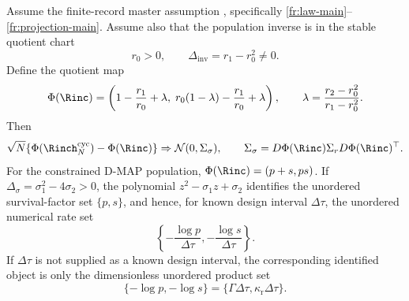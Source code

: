 \begin{proposition}\label{prop:finite-record-quotient-delta-detailed}
Assume the finite-record master assumption
, specifically
\ref{fr:law-main}--\ref{fr:projection-main}.  Assume also that the population
inverse is in the stable quotient chart
\[
r_0>0,\qquad \Delta_{\mathrm{inv}}=r_1-r_0^2\ne0 .
\]
Define the quotient map
\[
\Phi(\Rinc)=\left(1-\frac{r_1}{r_0}+\lambda,\;
r_0(1-\lambda)-\frac{r_1}{r_0}+\lambda\right),
\qquad
\lambda=\frac{r_2-r_0^2}{r_1-r_0^2}.
\]
Then
\[
\sqrt N\{\Phi(\Rinch_N^{\mathrm{cyc}})-\Phi(\Rinc)\}
\Rightarrow
\mathcal N(0,\Sigma_\sigma),
\qquad
\Sigma_\sigma=D\Phi(\Rinc)\Sigma_rD\Phi(\Rinc)^\top.
\]
For the constrained D-MAP population, \(\Phi(\Rinc)=(p+s,ps)\).  If
\(\Delta_\sigma=\sigma_1^2-4\sigma_2>0\), the polynomial
\(z^2-\sigma_1z+\sigma_2\) identifies the unordered survival-factor set
\(\{p,s\}\), and hence, for known design interval \(\Delta\tau\), the
unordered numerical rate set
\[
\left\{-\frac{\log p}{\Delta\tau},-\frac{\log s}{\Delta\tau}\right\}.
\]
If \(\Delta\tau\) is not supplied as a known design interval, the
corresponding identified object is only the dimensionless unordered product set
\[
\{-\log p,-\log s\}
=\{\Gamma\Delta\tau,\kappa_{\mathrm r}\Delta\tau\}.
\]
\end{proposition}

